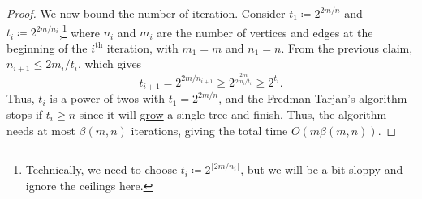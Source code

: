 \begin{proof}
	We now bound the number of iteration. Consider \(t_1 \coloneqq 2^{2m / n}\) and \(t_i \coloneqq 2^{2m / n_i}\),\footnote{Technically, we need to choose \(t_i \coloneqq 2^{\lceil 2m / n_i \rceil }\), but we will be a bit sloppy and ignore the ceilings here.} where \(n_i\) and \(m_i\) are the number of vertices and edges at the beginning of the \(i^{\text{th} }\) iteration, with \(m_1 = m\) and \(n_1 = n\). From the previous claim, \(n_{i+1} \leq 2m_i / t_i\), which gives
	\[
		t_{i+1}
		= 2^{2m / n_{i+1}}
		\geq 2^{\frac{2m}{2m_i / t_i}}
		\geq 2^{t_i}.
	\]
	Thus, \(t_i\) is a power of twos with \(t_1 = 2^{2m / n}\), and the \hyperref[algo:Fredman-Tarjan]{Fredman-Tarjan's algorithm} stops if \(t_i \geq n\) since it will \hyperref[algo:Fredman-Tarjan-I]{grow} a single tree and finish. Thus, the algorithm needs at most \(\beta (m, n)\) iterations, giving the total time \(O(m \beta (m, n))\).
\end{proof}